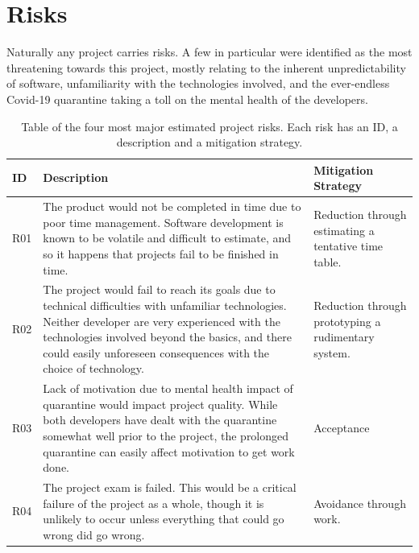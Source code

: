\section{Risks}

Naturally any project carries risks. A few in particular were identified as the most threatening towards this project, mostly relating to the inherent unpredictability of software, unfamiliarity with the technologies involved, and the ever-endless Covid-19 quarantine taking a toll on the mental health of the developers.

\begin{table}[H]
\begin{tabularx}{\textwidth}{|l|X|m{3.25cm}|}
\hline
ID  & Description & Mitigation Strategy \\ \hline\hline
R01 & The product would not be completed in time due to poor time management. Software development is known to be volatile and difficult to estimate, and so it happens that projects fail to be finished in time. & Reduction through estimating a tentative time table.          \\ \hline
R02 & The project would fail to reach its goals due to technical difficulties with unfamiliar technologies. Neither developer are very experienced with the technologies involved beyond the basics, and there could easily unforeseen consequences with the choice of technology.                                         & Reduction through prototyping a rudimentary system.           \\ \hline
R03 & Lack of motivation due to mental health impact of quarantine would impact project quality. While both developers have dealt with the quarantine somewhat well prior to the project, the prolonged quarantine can easily affect motivation to get work done.                                                                                & Acceptance          \\ \hline
R04 & The project exam is failed. This would be a critical failure of the project as a whole, though it is unlikely to occur unless everything that could go wrong did go wrong.                                                                                                                                         & Avoidance through work.           \\ \hline
\end{tabularx}
\caption{Table of the four most major estimated project risks. Each risk has an ID, a description and a mitigation strategy.}
\label{tab:risks}
\end{table}


